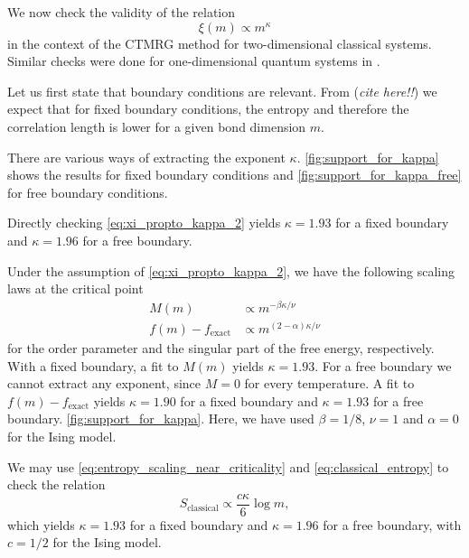 We now check the validity of the relation
\begin{equation}\label{eq:xi_propto_kappa_2}
  \xi(m) \propto m^{\kappa}
\end{equation}
in the context of the CTMRG method for two-dimensional
classical systems. Similar checks were done for one-dimensional quantum systems in \cite{tagliacozzo2008scaling}.

Let us first state that boundary conditions are relevant.
From (\emph{cite here!!}) we expect that for fixed boundary conditions,
the entropy and therefore the correlation length is lower for a given bond dimension $m$.

There are various ways of extracting the exponent $\kappa$.
\autoref{fig:support_for_kappa} shows the results for fixed boundary conditions and \autoref{fig:support_for_kappa_free}
for free boundary conditions.

Directly checking \autoref{eq:xi_propto_kappa_2} yields $\kappa = 1.93$ for a fixed boundary
and $\kappa = 1.96$ for a free boundary.

Under the assumption of \autoref{eq:xi_propto_kappa_2}, we have the following scaling laws at the critical point
\begin{align}\label{eq:scaling_laws_order_param_free_energy_kappa}
  M(m) & \propto m^{-\beta \kappa / \nu} \\
  f(m) - f_{\text{exact}} & \propto m^{(2-\alpha)\kappa / \nu}
\end{align}
for the order parameter and the singular part of the free energy, respectively.
With a fixed boundary, a fit to $M(m)$ yields $\kappa = 1.93$.
For a free boundary we cannot extract any exponent, since $M = 0$ for every temperature.
A fit to $f(m) - f_{\text{exact}}$ yields $\kappa = 1.90$ for a fixed boundary and $\kappa = 1.93$ for a free boundary.
\autoref{fig:support_for_kappa}. Here, we have used $\beta = 1/8$, $\nu = 1$ and $\alpha = 0$ for the Ising model.

We may use \autoref{eq:entropy_scaling_near_criticality} and \autoref{eq:classical_entropy} to check the
relation
\begin{equation}\label{eq:scaling_law_entropy_kappa}
  S_{\text{classical}} \propto \frac{c\kappa}{6}\log m,
\end{equation}
which yields $\kappa = 1.93$ for a fixed boundary and $\kappa = 1.96$ for a free boundary,
with $c = 1/2$ for the Ising model.

